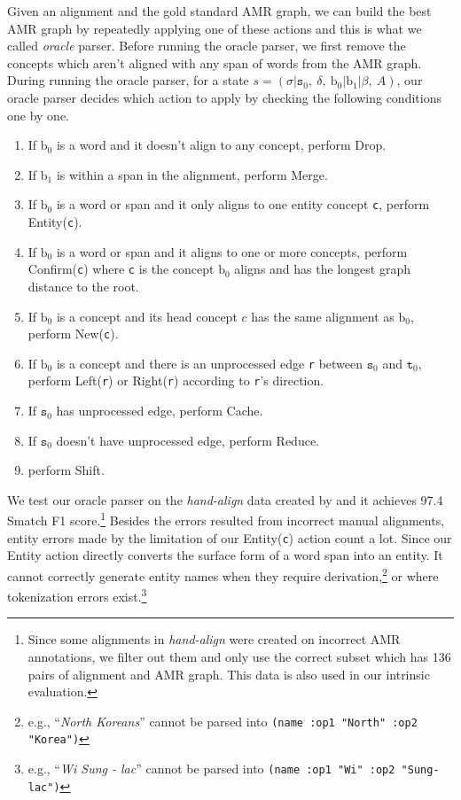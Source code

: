 \documentclass[11pt,a4paper]{article}
\begin{document}
Given an alignment and the gold standard AMR graph, we can build
the best AMR graph by repeatedly applying one of these actions and this is what we called {\it oracle} parser.
Before running the oracle parser, we first remove the
concepts which aren't aligned with any span of words from the AMR graph.
During running the oracle parser,
for a state ${ s = (\sigma | \texttt{s}_0,\ \delta,\ \text{b}_0 | \text{b}_1 | \beta,\ A) } $, 
our oracle parser decides which action to apply by checking the following conditions one by one.
\begin{enumerate}
	\setlength\itemsep{0em}
	\item If $\text{b}_0$ is a word and it doesn't align to any concept, perform {\sc Drop}.
	\item If $\text{b}_1$ is within a span in the alignment, perform {\sc Merge}.
	\item If $\text{b}_0$ is a word or span and it only aligns to one entity concept {\tt c}, perform {\sc Entity({\tt c})}.
	\item If $\text{b}_0$ is a word or span and it aligns to one or more concepts, perform {\sc Confirm({\tt c})} where
	{\tt c} is the concept $\text{b}_0$ aligns and has the longest graph distance to the root.
	\item If $\text{b}_0$ is a concept and its head concept $c$ has the same alignment as $\text{b}_0$,
	perform {\sc New({\tt c})}.
	\item If $\text{b}_0$ is a concept and there is an unprocessed edge {\tt r} between $\texttt{s}_0$ and $\texttt{t}_0$,
	perform {\sc Left({\tt r})} or {\sc Right({\tt r})} according to {\tt r}'s direction.
	\item If $\texttt{s}_0$ has unprocessed edge, perform {\sc Cache}.
	\item If $\texttt{s}_0$ doesn't have unprocessed edge, perform {\sc Reduce}.
	\item perform {\sc Shift}.
\end{enumerate}

We test our oracle parser on the {\it hand-align} data created by \citet{flanigan-EtAl:2014:P14-1}
and it achieves 97.4 Smatch F1 score.\footnote{
	Since some alignments in {\it hand-align} were created on incorrect AMR annotations, we filter out
	them and only use the correct subset which has 136 pairs of alignment and AMR graph.
	This data is also used in our intrinsic evaluation.}
Besides the errors resulted from incorrect manual alignments, entity errors made by the limitation of
our  {\sc Entity({\tt c})} action count a lot.
Since our {\sc Entity} action directly converts
the surface form of a word span into an entity. 
It cannot correctly generate 
entity names when they require derivation,\footnote{e.g., 
``{\it North Koreans}'' cannot be parsed into {\tt  (name :op1 "North" :op2 "Korea")}}
or where tokenization errors exist.\footnote{e.g., 
``{\it Wi Sung - lac}'' cannot be parsed into {\tt (name :op1 "Wi" :op2 "Sung-lac")} }
\end{document}
